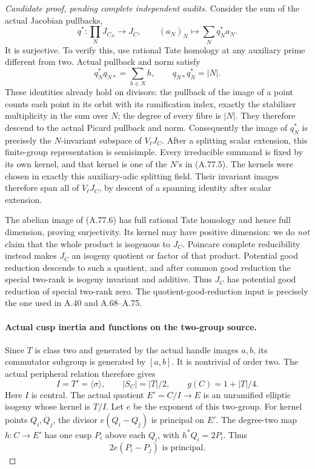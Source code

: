 \begin{proof}[Candidate proof, pending complete independent audits]
Consider the sum of the actual Jacobian pullbacks,
\[
       q^*:\prod_N J_{C_N}\longrightarrow J_C,
                  \qquad (a_N)_N\longmapsto\sum_Nq_N^*a_N.
                                                        \tag{A.77.6}
\]
It is surjective. To verify this, use rational Tate
homology at any auxiliary prime different from two.
Actual pullback and norm satisfy
\[
                 q_N^*q_{N*}=\sum_{h\in N}h,
          \qquad q_{N*}q_N^*=|N|.                    \tag{A.77.7}
\]
These identities already hold on divisors: the pullback of
 the image of a point counts each point in its orbit with
 its ramification index, exactly the stabilizer multiplicity
 in the sum over \(N\); the degree of every fibre is \(\lvert N\rvert\).
 They therefore descend to the actual Picard pullback and norm.
 Consequently the image of \(q_N^*\) is precisely
the \(N\)-invariant subspace of \(V_\ell J_C\).
After a splitting scalar extension, this finite-group
representation is semisimple. Every irreducible summand
is fixed by its own kernel, and that kernel is one of
the \(N\)'s in (A.77.5). The kernels were chosen in exactly this auxiliary-adic
splitting field. Their invariant images therefore span
all of \(V_\ell J_C\), by descent of a spanning
identity after scalar extension.

The abelian image of (A.77.6) has full rational Tate
homology and hence full dimension, proving surjectivity.
Its kernel may have positive dimension: we do \emph{not}
claim that the whole product is isogenous to \(J_C\).
Poincare complete reducibility instead makes \(J_C\)
an isogeny quotient or factor of that product. Potential
good reduction descends to such a quotient, and after
common good reduction the special two-rank is isogeny
invariant and additive. Thus \(J_C\) has potential
good reduction of special two-rank zero.
The quotient-good-reduction input is precisely the
one used in A.40 and A.68--A.75.
\cite[Corollary 2 to Theorem 1]{fghSerreTate1968}

\paragraph{Actual cusp inertia and functions on the two-group source.}
Since \(T\) is class two and generated by the actual
handle images \(a,b\), its commutator subgroup is
generated by \([a,b]\). It is nontrivial of order
two. The actual peripheral relation therefore gives
\[
 I=T'=\langle\sigma\rangle,
 \qquad |S_C|=|T|/2,
 \qquad g(C)=1+|T|/4.                                 \tag{A.77.8}
\]
Here \(I\) is central. The actual quotient
\(E'=C/I\to E\) is an unramified elliptic isogeny
whose kernel is \(T/I\). Let \(e\) be the exponent
of this two-group. For kernel points \(Q_i,Q_j\),
the divisor \(e(Q_i-Q_j)\) is principal on \(E'\).
The degree-two map \(h:C\to E'\) has one cusp
\(P_i\) above each \(Q_i\), with \(h^*Q_i=2P_i\).
Thus
\[
                        2e(P_i-P_j)\text{ is principal}.
                                                        \tag{A.77.9}
\]


\end{proof}
